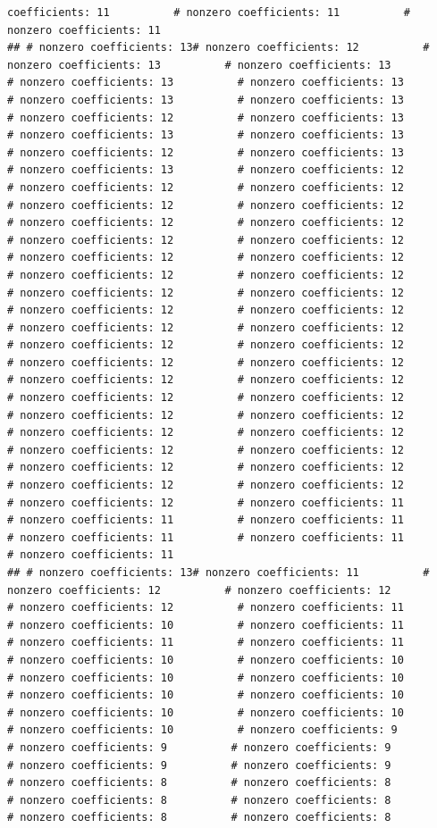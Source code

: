 \documentclass[
]{article}
\begin{document}
\begin{verbatim}
coefficients: 11          # nonzero coefficients: 11          # nonzero coefficients: 11          
## # nonzero coefficients: 13# nonzero coefficients: 12          # nonzero coefficients: 13          # nonzero coefficients: 13          # nonzero coefficients: 13          # nonzero coefficients: 13          # nonzero coefficients: 13          # nonzero coefficients: 13          # nonzero coefficients: 12          # nonzero coefficients: 13          # nonzero coefficients: 13          # nonzero coefficients: 13          # nonzero coefficients: 12          # nonzero coefficients: 13          # nonzero coefficients: 13          # nonzero coefficients: 12          # nonzero coefficients: 12          # nonzero coefficients: 12          # nonzero coefficients: 12          # nonzero coefficients: 12          # nonzero coefficients: 12          # nonzero coefficients: 12          # nonzero coefficients: 12          # nonzero coefficients: 12          # nonzero coefficients: 12          # nonzero coefficients: 12          # nonzero coefficients: 12          # nonzero coefficients: 12          # nonzero coefficients: 12          # nonzero coefficients: 12          # nonzero coefficients: 12          # nonzero coefficients: 12          # nonzero coefficients: 12          # nonzero coefficients: 12          # nonzero coefficients: 12          # nonzero coefficients: 12          # nonzero coefficients: 12          # nonzero coefficients: 12          # nonzero coefficients: 12          # nonzero coefficients: 12          # nonzero coefficients: 12          # nonzero coefficients: 12          # nonzero coefficients: 12          # nonzero coefficients: 12          # nonzero coefficients: 12          # nonzero coefficients: 12          # nonzero coefficients: 12          # nonzero coefficients: 12          # nonzero coefficients: 12          # nonzero coefficients: 12          # nonzero coefficients: 12          # nonzero coefficients: 12          # nonzero coefficients: 12          # nonzero coefficients: 11          # nonzero coefficients: 11          # nonzero coefficients: 11          # nonzero coefficients: 11          # nonzero coefficients: 11          # nonzero coefficients: 11          
## # nonzero coefficients: 13# nonzero coefficients: 11          # nonzero coefficients: 12          # nonzero coefficients: 12          # nonzero coefficients: 12          # nonzero coefficients: 11          # nonzero coefficients: 10          # nonzero coefficients: 11          # nonzero coefficients: 11          # nonzero coefficients: 11          # nonzero coefficients: 10          # nonzero coefficients: 10          # nonzero coefficients: 10          # nonzero coefficients: 10          # nonzero coefficients: 10          # nonzero coefficients: 10          # nonzero coefficients: 10          # nonzero coefficients: 10          # nonzero coefficients: 10          # nonzero coefficients: 9          # nonzero coefficients: 9          # nonzero coefficients: 9          # nonzero coefficients: 9          # nonzero coefficients: 9          # nonzero coefficients: 8          # nonzero coefficients: 8          # nonzero coefficients: 8          # nonzero coefficients: 8          # nonzero coefficients: 8          # nonzero coefficients: 8          

\end{verbatim}
\end{document}
